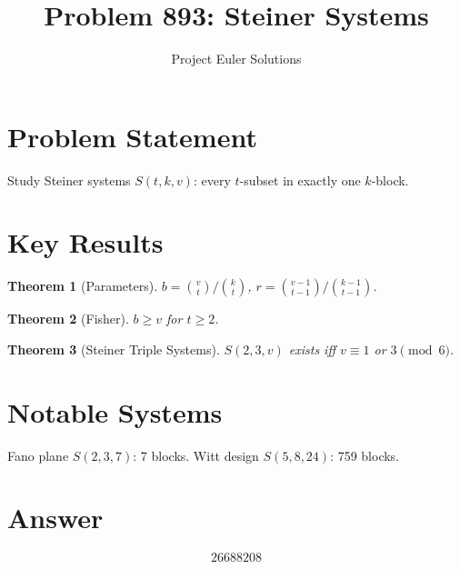\documentclass[11pt]{article}
\title{Problem 893: Steiner Systems}
\author{Project Euler Solutions}
\date{}
\newtheorem{theorem}{Theorem}
\begin{document}
\maketitle

\section{Problem Statement}
Study Steiner systems $S(t,k,v)$: every $t$-subset in exactly one $k$-block.

\section{Key Results}

\begin{theorem}[Parameters]
$b = \binom{v}{t}/\binom{k}{t}$, $r = \binom{v-1}{t-1}/\binom{k-1}{t-1}$.
\end{theorem}

\begin{theorem}[Fisher]
$b \ge v$ for $t \ge 2$.
\end{theorem}

\begin{theorem}[Steiner Triple Systems]
$S(2,3,v)$ exists iff $v \equiv 1$ or $3 \pmod{6}$.
\end{theorem}

\section{Notable Systems}
Fano plane $S(2,3,7)$: 7 blocks. Witt design $S(5,8,24)$: 759 blocks.

\section{Answer}

\[
\boxed{26688208}
\]
\end{document}
